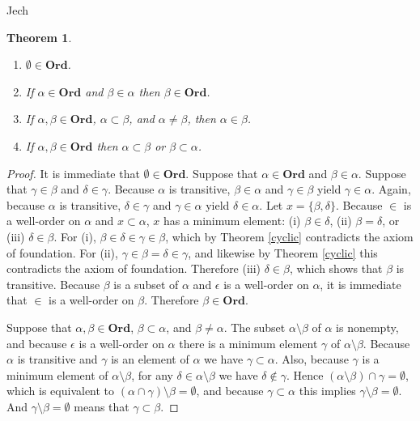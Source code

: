 \documentclass{article}
\newtheorem{theorem}{Theorem}
\theoremstyle{definition}
\begin{document}
Jech \cite[p.~19, Lemma 2.11]{jech}

\begin{theorem}
\begin{enumerate}
\item $\emptyset \in \mathbf{Ord}$.
\item If $\alpha \in \mathbf{Ord}$ and $\beta \in \alpha$ then $\beta \in \mathbf{Ord}$.
\item If $\alpha,\beta \in \mathbf{Ord}$, $\alpha \subset \beta$, and $\alpha \neq \beta$, then
$\alpha \in \beta$.
\item If $\alpha,\beta \in \mathbf{Ord}$ then $\alpha \subset \beta$ or $\beta \subset \alpha$.
\end{enumerate}
\end{theorem}
\begin{proof}
It is immediate that $\emptyset \in \mathbf{Ord}$. Suppose that $\alpha \in \mathbf{Ord}$ and $\beta \in \alpha$. 
Suppose that $\gamma \in \beta$ and $\delta \in \gamma$. Because $\alpha$ is transitive, $\beta \in \alpha$ and
$\gamma \in \beta$ yield $\gamma \in \alpha$. Again, because $\alpha$ is transitive, $\delta \in \gamma$ and
$\gamma \in \alpha$ yield $\delta \in \alpha$. 
Let $x=\{\beta,\delta\}$. Because $\in$ is a well-order on $\alpha$ and $x \subset \alpha$, $x$ has a minimum element:
(i) $\beta \in \delta$, (ii) $\beta=\delta$, or (iii) $\delta \in \beta$. 
For (i), $\beta \in \delta \in \gamma \in \beta$, which by Theorem
\ref{cyclic} contradicts the axiom of foundation. For (ii), $\gamma \in \beta = \delta \in \gamma$, 
and likewise by Theorem
\ref{cyclic} this contradicts the axiom of foundation. Therefore (iii) $\delta \in \beta$, which shows that $\beta$ is transitive.
Because $\beta$ is a subset of $\alpha$ and $\epsilon$ is a well-order on $\alpha$, it is immediate that $\in$ is a well-order on $\beta$. Therefore
$\beta \in \mathbf{Ord}$.

Suppose that $\alpha,\beta \in \mathbf{Ord}$, $\beta \subset \alpha$, and $\beta \neq \alpha$. 
The subset $\alpha \setminus \beta$ of $\alpha$ is nonempty, and because $\epsilon$ is a well-order on $\alpha$
there is a minimum element $\gamma$ of $\alpha \setminus \beta$. Because $\alpha$ is transitive and
$\gamma$ is an element of $\alpha$ we have $\gamma \subset \alpha$. 
Also, because $\gamma$ is a minimum element of $\alpha \setminus \beta$, for any $\delta \in \alpha \setminus \beta$
we have $\delta \not \in \gamma$. Hence $(\alpha \setminus \beta) \cap \gamma = \emptyset$, which
is equivalent to $(\alpha \cap \gamma) \setminus \beta = \emptyset$, and because $\gamma \subset \alpha$ this implies
$\gamma \setminus \beta = \emptyset$. And $\gamma \setminus \beta = \emptyset$ means
that
$\gamma \subset \beta$. 
\end{proof}
\end{document}
